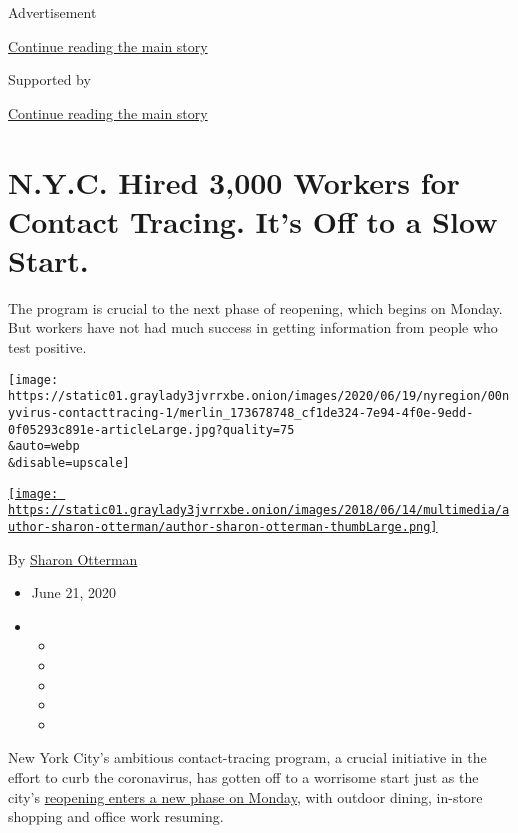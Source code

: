 Advertisement

\protect\hyperlink{after-top}{Continue reading the main story}

Supported by

\protect\hyperlink{after-sponsor}{Continue reading the main story}

\hypertarget{nyc-hired-3000-workers-for-contact-tracing-its-off-to-a-slow-start}{%
\section{N.Y.C. Hired 3,000 Workers for Contact Tracing. It's Off to a
Slow
Start.}\label{nyc-hired-3000-workers-for-contact-tracing-its-off-to-a-slow-start}}

The program is crucial to the next phase of reopening, which begins on
Monday. But workers have not had much success in getting information
from people who test positive.

\texttt{[image: https://static01.graylady3jvrrxbe.onion/images/2020/06/19/nyregion/00nyvirus-contacttracing-1/merlin\_173678748\_cf1de324-7e94-4f0e-9edd-0f05293c891e-articleLarge.jpg?quality=75\\\&auto=webp\\\&disable=upscale]}

\href{https://www.nytimes3xbfgragh.onion/by/sharon-otterman}{\texttt{[image: https://static01.graylady3jvrrxbe.onion/images/2018/06/14/multimedia/author-sharon-otterman/author-sharon-otterman-thumbLarge.png]}}

By \href{https://www.nytimes3xbfgragh.onion/by/sharon-otterman}{Sharon
Otterman}

\begin{itemize}
\item
  June 21, 2020
\item
  \begin{itemize}
  \item
  \item
  \item
  \item
  \item
  \end{itemize}
\end{itemize}

New York City's ambitious contact-tracing program, a crucial initiative
in the effort to curb the coronavirus, has gotten off to a worrisome
start just as the city's
\href{https://www.nytimes3xbfgragh.onion/2020/06/18/nyregion/phase-2-reopening-nyc.html}{reopening
enters a new phase on Monday}, with outdoor dining, in-store shopping
and office work resuming.

